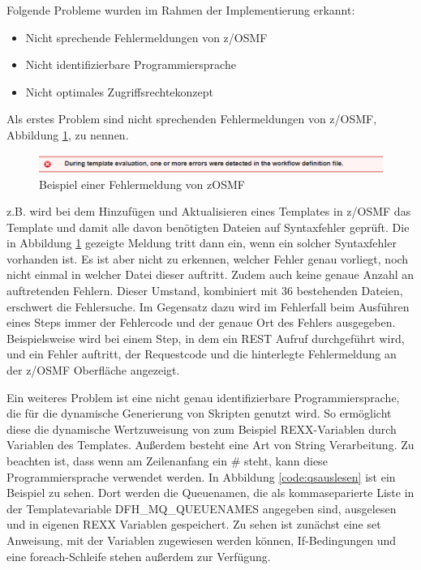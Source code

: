 Folgende Probleme wurden im Rahmen der Implementierung erkannt:

\begin{samepage}
\begin{itemize}
\item Nicht sprechende Fehlermeldungen von z/OSMF
\item Nicht identifizierbare Programmiersprache
\item Nicht optimales Zugriffsrechtekonzept
\end{itemize}
\end{samepage}

Als erstes Problem sind nicht sprechenden Fehlermeldungen von z/OSMF, Abbildung \ref{fig:zosmffehler}, zu nennen.
\begin{figure}[h]
	\centering
	\includegraphics[width=\textwidth]{figures/zosmffehlermeldung.png}
	\caption{Beispiel einer Fehlermeldung von zOSMF}
	\label{fig:zosmffehler}
\end{figure}
z.B. wird bei dem Hinzufügen und Aktualisieren eines Templates in z/OSMF das Template und damit alle davon benötigten Dateien auf Syntaxfehler geprüft.
Die in Abbildung \ref{fig:zosmffehler} gezeigte Meldung tritt dann ein, wenn ein solcher Syntaxfehler vorhanden ist.
Es ist aber nicht zu erkennen, welcher Fehler genau vorliegt, noch nicht einmal in welcher Datei dieser auftritt.
Zudem auch keine genaue Anzahl an auftretenden Fehlern.
Dieser Umstand, kombiniert mit 36 bestehenden Dateien, erschwert die Fehlersuche.
Im Gegensatz dazu wird im Fehlerfall beim Ausführen eines Steps immer der Fehlercode und der genaue Ort des Fehlers ausgegeben.
Beispielsweise wird bei einem Step, in dem ein REST Aufruf durchgeführt wird, und ein Fehler auftritt, der Requestcode und die hinterlegte Fehlermeldung an der z/OSMF Oberfläche angezeigt. 

Ein weiteres Problem ist eine nicht genau identifizierbare Programmiersprache, die für die dynamische Generierung von Skripten genutzt wird.
So ermöglicht diese die dynamische Wertzuweisung von zum Beispiel REXX-Variablen durch Variablen des Templates.
Außerdem besteht eine Art von String Verarbeitung.
Zu beachten ist, dass wenn am Zeilenanfang ein \glqq\#\grqq{} steht, kann diese Programmiersprache verwendet werden.
In Abbildung \ref{code:qsauslesen} ist ein Beispiel zu sehen.
Dort werden die Queuenamen, die als kommaseparierte Liste in der Templatevariable \glqq DFH\_MQ\_QUEUENAMES\grqq{} angegeben sind, ausgelesen und in eigenen REXX Variablen gespeichert.
Zu sehen ist zunächst eine \glqq set\grqq{} Anweisung, mit der Variablen zugewiesen werden können, If-Bedingungen und eine foreach-Schleife stehen außerdem zur Verfügung.


